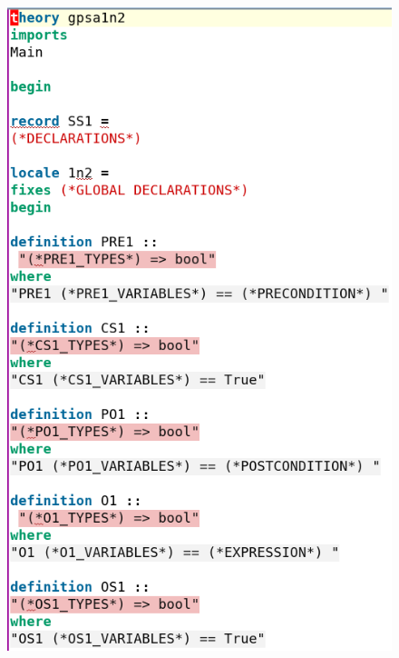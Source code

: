  \begin{figure}[H]
     \centering
     \begin{minipage}{0.45\textwidth}
     \centering
     \includegraphics[width=\linewidth]{Figures/fullexample/sfisabelle1.png}
     \end{minipage}\hfill
     \begin{minipage}{0.45\textwidth}
     \centering

\end{minipage}
\end{figure}
